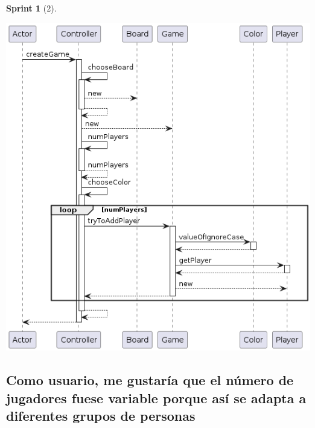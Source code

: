 \documentclass[12pt,a4paper,openright]{book}
\theoremstyle{break}
\newtheorem*{sprint}{Sprint}
\begin{document}
\begin{sprint}[2]
\begin{center}
\includegraphics[scale=0.5]{Controller.createGame()-sprint2.png} 
\end{center}
\end{sprint}

\subsection{Como usuario, me gustaría que el número de jugadores fuese variable porque así se adapta a diferentes grupos de personas}
\end{document}

